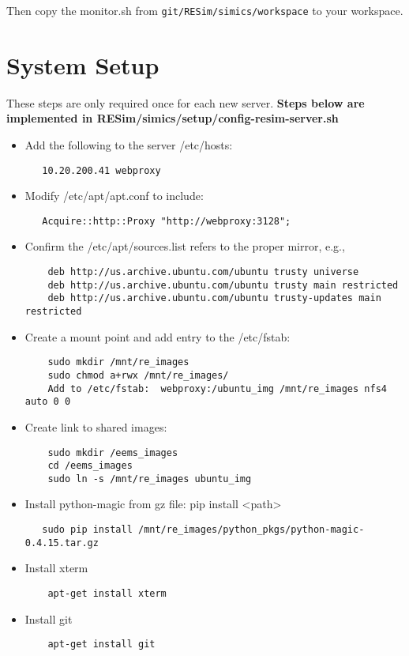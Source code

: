 \documentclass[titlepage]{article}
\begin{document}
Then copy the monitor.sh from {\tt git/RESim/simics/workspace} to your workspace.


\section{System Setup} 
\label{section-system}
These steps are only required once for each new server.
\textbf{Steps below are implemented in RESim/simics/setup/config-resim-server.sh}


\begin{itemize}
\item Add the following to the server /etc/hosts:
\begin{verbatim}
   10.20.200.41 webproxy
\end{verbatim}

\item Modify /etc/apt/apt.conf to include:
\begin{verbatim}
   Acquire::http::Proxy "http://webproxy:3128";
\end{verbatim}

\item Confirm the /etc/apt/sources.list refers to the proper mirror, e.g., 
\begin{verbatim}
    deb http://us.archive.ubuntu.com/ubuntu trusty universe
    deb http://us.archive.ubuntu.com/ubuntu trusty main restricted
    deb http://us.archive.ubuntu.com/ubuntu trusty-updates main restricted
\end{verbatim}


\item Create a mount point and add entry to the /etc/fstab:
\begin{verbatim}
    sudo mkdir /mnt/re_images
    sudo chmod a+rwx /mnt/re_images/
    Add to /etc/fstab:  webproxy:/ubuntu_img /mnt/re_images nfs4 auto 0 0
\end{verbatim}

\item Create link to shared images:
\begin{verbatim}
    sudo mkdir /eems_images
    cd /eems_images
    sudo ln -s /mnt/re_images ubuntu_img
\end{verbatim}


\item Install python-magic from gz file:  pip install <path>
\begin{verbatim}
   sudo pip install /mnt/re_images/python_pkgs/python-magic-0.4.15.tar.gz
\end{verbatim}

\item Install xterm
\begin{verbatim}
    apt-get install xterm
\end{verbatim}

\item Install git
\begin{verbatim}
    apt-get install git
\end{verbatim}
\end{itemize}
\end{document}
